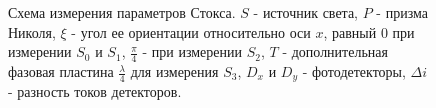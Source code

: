\begin{figure}
\centering



\caption{Схема измерения параметров Стокса. $S$ - источник света, $P$
  - призма Николя, $\xi$ - угол ее ориентации относительно оси $x$,
  равный 0 при измерении $S_0$ и $S_1$, $\frac{\pi}{4}$ - при
  измерении $S_2$, $T$ - дополнительная фазовая пластина
$\frac{\lambda}{4}$ для измерения $S_3$, $D_x$ и $D_y$ -
фотодетекторы, $\Delta i$ - разность токов детекторов.}
\label{figPart3EntangStokes}
\end{figure}
